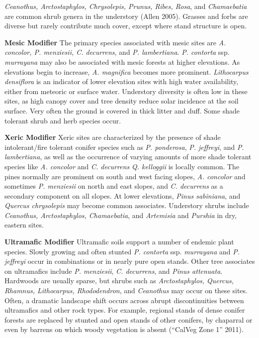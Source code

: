 \emph{Ceanothus, Arctostaphylos, Chrysolepis, Prunus, Ribes, Rosa}, and \emph{Chamaebatia} are common shrub genera in the understory (Allen 2005). Grasses and forbs are diverse but rarely contribute much cover, except where stand structure is open. 


\begin{adjustwidth}{2cm}{}
\medskip
\noindent \textbf{Mesic Modifier } The primary species associated with mesic sites are \emph{A. concolor, P. menziesii, C. decurrens}, and \emph{P. lambertiana}. \emph{P. contorta} ssp. \emph{murrayana} may also be associated with mesic forests at higher elevations. As elevations begin to increase, \emph{A. magnifica} becomes more prominent. \emph{Lithocarpus densiflora} is an indicator of lower elevation sites with high water availability, either from meteoric or surface water. Understory diversity is often low in these sites, as high canopy cover and tree density reduce solar incidence at the soil surface. Very often the ground is covered in thick litter and duff. Some shade tolerant shrub and herb species occur.

\medskip
\noindent \textbf{Xeric Modifier}  Xeric sites are characterized by the presence of shade intolerant/fire tolerant conifer species such as \emph{P. ponderosa}, \emph{P. jeffreyi}, and \emph{P. lambertiana}, as well as the occurrence of varying amounts of more shade tolerant species like \emph{A. concolor} and \emph{C. decurrens}  \emph{Q. kelloggii} is locally common. The pines normally are prominent on south and west facing slopes, \emph{A. concolor} and sometimes \emph{P. menziesii}  on north and east slopes, and \emph{C. decurrens} as a secondary component on all slopes. At lower elevations, \emph{Pinus sabiniana}, and \emph{Quercus chrysolepis} may become common associates. Understory shrubs include \emph{Ceanothus, Arctostaphylos, Chamaebatia}, and \emph{Artemisia} and \emph{Purshia} in dry, eastern sites.

\medskip
\noindent \textbf{Ultramafic Modifier} Ultramafic soils support a number of endemic plant species. Slowly growing and often stunted \emph{P. contorta} ssp. \emph{murrayana} and \emph{P. jeffreyi} occur in combinations or in nearly pure open stands. Other tree associates on ultramafics include \emph{P. menziesii}, \emph{C. decurrens}, and \emph{Pinus attenuata}. Hardwoods are usually sparse, but shrubs such as \emph{Arctostaphylos, Quercus, Rhamnus, Lithocarpus, Rhododendron}, and \emph{Ceanothus} may occur on these sites. Often, a dramatic landscape shift occurs across abrupt discontinuities between ultramafics and other rock types. For example, regional stands of dense conifer forests are replaced by stunted and open stands of other conifers, by chaparral or even by barrens on which woody vegetation is absent (``CalVeg Zone 1'' 2011).

\end{adjustwidth}

